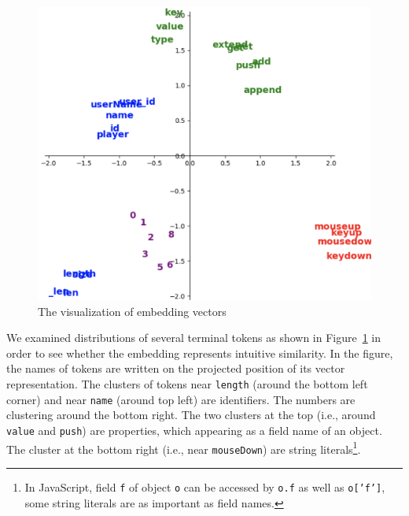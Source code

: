\documentclass[E]{compsoft}
\begin{document}
\begin{figure}[!ht]
\centering
\includegraphics[scale=0.34]{pictures/node2vec_visualization.png}
\caption{The visualization of embedding vectors}
\label{fig:node2vec_visualization}
\end{figure}

We examined distributions of several terminal tokens as shown in Figure~\ref{fig:node2vec_visualization} in order to see whether the embedding
represents intuitive similarity.  In the figure, the names of tokens are written on the projected position of its vector representation.  The clusters of tokens near \texttt{length} (around the bottom left corner) and near \texttt{name} (around top left) are identifiers.  The numbers are clustering around the bottom right.  The two clusters at the top (i.e., around \texttt{value} and \texttt{push}) are properties, which appearing as a field name of an object.  The cluster at the bottom right (i.e., near \texttt{mouseDown}) are string literals\footnote{In JavaScript, field \texttt{f} of object \texttt{o} can be accessed by \texttt{o.f} as well as \texttt{o['f']}, some string literals are as important as field names.}.
\end{document}

